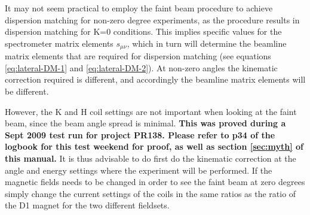 \documentclass[11pt]{report}
\begin{document}
It may not seem practical to employ the faint beam procedure to achieve dispersion
matching for non-zero degree experiments, as the procedure results in
dispersion matching for K=0 conditions. This implies specific values for
the spectrometer matrix elements $s_{\mu\nu}$, which in turn will determine the
beamline matrix elements that are required for dispersion matching (see equations
\ref{eq:lateral-DM-1} and \ref{eq:lateral-DM-2}).
At non-zero angles the kinematic correction required is different, and accordingly
the beamline matrix elements will be different.

However,
the K and H coil settings are not important when looking
at the faint beam, since the beam angle spread is minimal.
{\bf This was proved during a Sept 2009 test run for project PR138.
Please refer to p34 of the logbook for this test weekend for proof, as well as
section \ref{sec:myth} of this manual.}
It is thus advisable to do first do the kinematic correction at the angle
and energy settings where the experiment will be performed. If the magnetic
fields needs to be changed in order to see the faint beam at zero degrees
simply change the current settings of the coils in the same ratios as the 
ratio of the D1 magnet for the two different fieldsets.%


%


%
%
\end{document}
